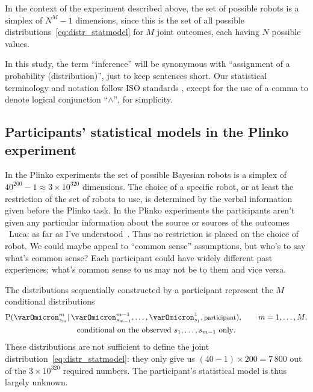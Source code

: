 \documentclass[\ifafour a4paper,12pt,\else a5paper,10pt,\fi%
onecolumn,oneside,article,%
british%
]{memoir}
\theoremstyle{remark}
\theoremstyle{innote}
\newcommand*{\citep}{\parencites}
\newcommand*{\p}{\mathrm{P}}%
\renewcommand*{\|}{\mathpunct{|}}
\newcommand*{\puzzle}{\maltese}
\newcommand{\mynote}[1]{ {\color{notecolour}\puzzle\ #1\ }}
\begin{document}
In the context of the experiment described above, the set of possible
robots is a simplex of $N^M-1$ dimensions, since this is the set of all
possible distributions~\eqref{eq:distr_statmodel} for $M$ joint outcomes,
each having $N$ possible values.

In this study, the term \enquote{inference} will be synonymous with
\enquote{assignment of a probability (distribution)}, just to keep
sentences short. Our statistical terminology and notation follow ISO
standards \citep{iso1993_r2009,iso2006}, except for the use of a comma to
denote logical conjunction \enquote{$\land$}, for simplicity.

\subsection{Participants' statistical models in the Plinko experiment}
\label{sec:plinko_statmodels}

In the Plinko experiments \citep{filipowiczetal2014,filipowiczetal2016} the
set of possible Bayesian robots is a simplex of
$40^{200}-1 \approx 3\times10^{320}$ dimensions. The choice of a specific
robot, or at least the restriction of the set of robots to use, is
determined by the verbal information given before the Plinko task. In the
Plinko experiments the participants aren't given any particular information
about the source or sources of the outcomes \mynote{Luca: as far as I've
  understood}. Thus no restriction is placed on the choice of robot. We
could maybe appeal to \enquote{common sense} assumptions, but who's to say
what's common sense? Each participant could have widely different past
experiences; what's common sense to us may not be to them and vice versa.

The distributions sequentially constructed by a participant represent the
$M$ conditional distributions
\begin{multline}
  \p(\varOmicron^m_{s_m} \| \varOmicron^{m-1}_{s_{m-1}},\dotsc,\varOmicron^1_{s_1},
  \text{\footnotesize participant}),
  \qquad m=1,\dotsc,M,\\
  \text{conditional on the observed $s_1,\dotsc,s_{m-1}$ only}.
\label{eq:cond_distribs}
\end{multline}
These distributions are not sufficient to define the joint
distribution~\eqref{eq:distr_statmodel}: they only give us
$(40-1)\times 200=7\,800$ out of the $3\times 10^{320}$ required numbers. The
participant's statistical model is thus largely unknown.
\end{document}

